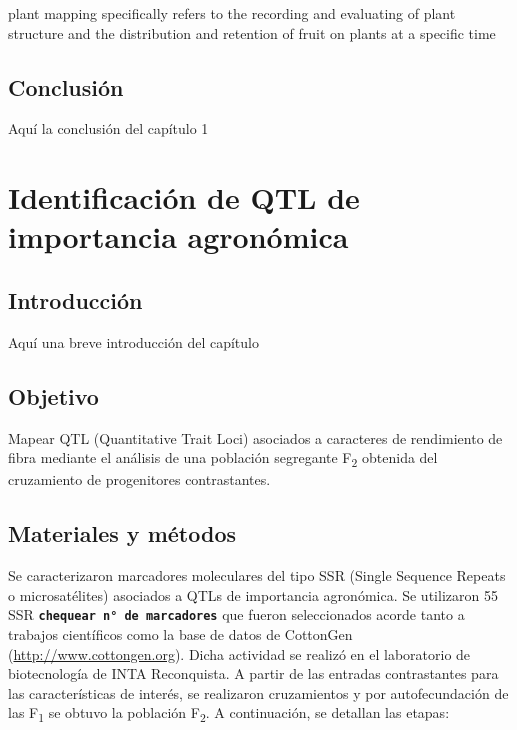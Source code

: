 \documentclass[12pt,oneside]{reedthesis}
\begin{document}
plant mapping specifically refers to the recording and evaluating of plant structure and the distribution and retention of fruit on plants at a specific time \autocite{kerby2010}

\section{Conclusión}\label{conclusiuxf3n}

Aquí la conclusión del capítulo 1

\chapter{Identificación de QTL de importancia agronómica}\label{math-sci}

\section{Introducción}\label{introducciuxf3n-2}

Aquí una breve introducción del capítulo

\section{Objetivo}\label{objetivo}

Mapear QTL (Quantitative Trait Loci) asociados a caracteres de rendimiento de fibra mediante el análisis de una población segregante F\textsubscript{2} obtenida del cruzamiento de progenitores contrastantes.

\section{Materiales y métodos}\label{materiales-y-muxe9todos-1}

Se caracterizaron marcadores moleculares del tipo SSR (Single Sequence Repeats o microsatélites) asociados a QTLs de importancia agronómica. Se utilizaron 55 SSR \textbf{\texttt{chequear\ n°\ de\ marcadores}} que fueron seleccionados acorde tanto a trabajos científicos \autocite{zhang2005,shen2007,wang2007,wang2014,xia2014,wang2015,an2010,liu2012,qin2015,shi2015,su2016,zhang2016,ademe2017,liu2017,iqbal2017,li2017,baytar2018,liu2018} como la base de datos de CottonGen (\url{http://www.cottongen.org}). Dicha actividad se realizó en el laboratorio de biotecnología de INTA Reconquista. A partir de las entradas contrastantes para las características de interés, se realizaron cruzamientos y por autofecundación de las F\textsubscript{1} se obtuvo la población F\textsubscript{2}. A continuación, se detallan las etapas:
\end{document}
